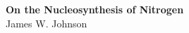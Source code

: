 \documentclass[12pt]{report}
\newcommand{\biblio}{
	
	
}
\begin{document}
 
\renewcommand{\biblio}{} 

\begin{center} 
\textbf{{\Large On the Nucleosynthesis of Nitrogen}} 
\\ 
James W. Johnson 
\end{center}

 
\newpage 
 
\newpage 
 
\newpage 
 

 
 
\end{document}
